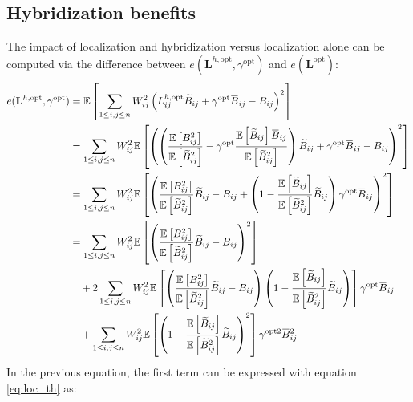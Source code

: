 \documentclass[12pt]{scrartcl}
\newcommand{\overbar}[1]{\mkern 1.5mu\overline{\mkern-1.5mu#1\mkern-1.5mu}\mkern 1.5mu}
\begin{document}
\subsection{Hybridization benefits}
The impact of localization and hybridization versus localization alone can be computed via the difference between $e(\mathbf{L}^{h,\mathrm{opt}},\gamma^\mathrm{opt})$ and $e(\mathbf{L}^\mathrm{opt})$:
\begin{align}
e(\mathbf{L}^{h,\mathrm{opt}},\gamma^\mathrm{opt}) & = \mathbb{E} \left[\sum_{1 \le i,j \le n} W_{ij}^2 \left(L^{h,\mathrm{opt}}_{ij} \widetilde{B}_{ij} + \gamma^\mathrm{opt} \overbar{B}_{ij} - B_{ij}\right)^2\right] \nonumber \\
& = \sum_{1 \le i,j \le n} W_{ij}^2 \mathbb{E} \left[\left(\left(\frac{\mathbb{E} \left[B^2_{ij}\right]}{\mathbb{E} \left[\widetilde{B}_{ij}^2\right]} - \gamma^\mathrm{opt} \frac{\mathbb{E} \left[\widetilde{B}_{ij}\right] \overbar{B}_{ij}}{\mathbb{E} \left[\widetilde{B}_{ij}^2\right]} \right) \widetilde{B}_{ij} + \gamma^\mathrm{opt} \overbar{B}_{ij} - B_{ij}\right)^2\right] \nonumber \\
& = \sum_{1 \le i,j \le n} W_{ij}^2 \mathbb{E} \left[\left(\frac{\mathbb{E} \left[B^2_{ij}\right]}{\mathbb{E} \left[\widetilde{B}_{ij}^2\right]} \widetilde{B}_{ij}  - B_{ij} + \left(1 - \frac{\mathbb{E} \left[\widetilde{B}_{ij}\right]}{\mathbb{E} \left[\widetilde{B}_{ij}^2\right]} \widetilde{B}_{ij}\right) \gamma^\mathrm{opt} \overbar{B}_{ij}\right)^2\right] \nonumber \\
& = \sum_{1 \le i,j \le n} W_{ij}^2 \mathbb{E} \left[\left(\frac{\mathbb{E} \left[B^2_{ij}\right]}{\mathbb{E} \left[\widetilde{B}_{ij}^2\right]} \widetilde{B}_{ij} - B_{ij} \right)^2 \right] \nonumber \\
& \quad + 2 \sum_{1 \le i,j \le n} W_{ij}^2 \mathbb{E} \left[\left(\frac{\mathbb{E} \left[B^2_{ij}\right]}{\mathbb{E} \left[\widetilde{B}_{ij}^2\right]} \widetilde{B}_{ij} - B_{ij}\right) \left(1 - \frac{\mathbb{E} \left[\widetilde{B}_{ij}\right]}{\mathbb{E} \left[\widetilde{B}_{ij}^2\right]} \widetilde{B}_{ij}\right)\right] \gamma^\mathrm{opt} \overbar{B}_{ij} \nonumber \\
& \quad +  \sum_{1 \le i,j \le n} W_{ij}^2 \mathbb{E} \left[ \left(1 - \frac{\mathbb{E} \left[\widetilde{B}_{ij}\right]}{\mathbb{E} \left[\widetilde{B}_{ij}^2\right]} \widetilde{B}_{ij}\right)^2\right] \gamma^{\mathrm{opt}2} \overbar{B}_{ij}^2
\end{align}
In the previous equation, the first term can be expressed with equation \eqref{eq:loc_th} as:
\end{document}
